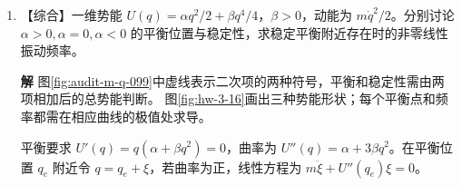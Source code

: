 \documentclass[11pt,openany,fontset=fandol]{ctexbook}
\theoremstyle{plain}\newtheorem{theorem}{定理}[chapter]\newtheorem{proposition}[theorem]{命题}
\theoremstyle{definition}\newtheorem{definition}{定义}[chapter]\newtheorem{example}{例}[chapter]
\theoremstyle{remark}\newtheorem*{remark}{说明}
\newcommand{\SolutionStart}{\par\nobreak\medskip\nobreak\noindent\textbf{解}\quad\ignorespaces}
\newenvironment{solution}{\SolutionStart}{\par\medskip}
\begin{document}
\begin{enumerate}[label=3.\arabic*]
\begin{solution}
\begin{figure}[H]\centering
{}
\caption{题3.15：失谐来自两外侧弹簧刚度不同，中间弹簧满足 $\kappa/k=0.02$。}\label{fig:ex-3-15}
\end{figure}

以 $\delta=0$ 检查长时间误差，精确频差为
\[
\Delta\omega=\omega_0(\sqrt{1+2\epsilon}-1)
=\omega_0(\epsilon-\epsilon^2/2+O(\epsilon^3)).
\]
若仅用$\epsilon\omega_0$，频差误差约为$\epsilon^2\omega_0/2$。经历$n$次单程转移，时间量级为$t\sim n\pi/(\epsilon\omega_0)$，所以两个模之间的相位差$\Delta\omega t$的误差约为$n\pi\epsilon/2$。包络中的慢正弦使用相位$\Delta\omega t/2$，其相位误差为前者的一半，即$n\pi\epsilon/4$。即使耦合很弱，交换次数足够多后仍须使用精确频率。

失谐既增大频差又降低转移包络；可把表中的三组幅值与图\ref{fig:hw-4-7}的包络上界曲线交叉核对。
\end{solution}

\item \begin{minipage}[t]{\linewidth}
【综合】一维势能 $U(q)=\alpha q^2/2+\beta q^4/4$，$\beta>0$，动能为 $m\dot q^2/2$。分别讨论 $\alpha>0,\alpha=0,\alpha<0$ 的平衡位置与稳定性，求稳定平衡附近存在时的非零线性振动频率。
\end{minipage}

\begin{solution}
图\ref{fig:audit-m-q-099}中虚线表示二次项的两种符号，平衡和稳定性需由两项相加后的总势能判断。
图\ref{fig:hw-3-16}画出三种势能形状；每个平衡点和频率都需在相应曲线的极值处求导。

平衡要求 $U'(q)=q(\alpha+\beta q^2)=0$，曲率为 $U''(q)=\alpha+3\beta q^2$。在平衡位置 $q_e$ 附近令 $q=q_e+\xi$，若曲率为正，线性方程为 $m\ddot\xi+U''(q_e)\xi=0$。


\end{solution}
\end{enumerate}
\end{document}
